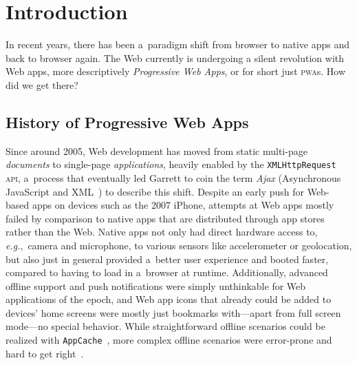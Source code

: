 \documentclass[sigconf]{acmart}
\begin{document}
%
%


\maketitle

\section{Introduction}

In recent years, there has been a~paradigm shift
from browser to native apps and back to browser again.
The Web currently is undergoing a silent revolution with Web apps,
more descriptively \emph{Progressive Web Apps},
or for short just \textsc{pwa}s.
How did we get there?

\subsection{History of Progressive Web Apps}

Since around 2005, Web development has moved from static multi-page \emph{documents}
to single-page \emph{applications}, heavily enabled by the \texttt{XMLHttpRequest} \textsc{api},
a~process that eventually led Garrett to coin the term \emph{Ajax}
(Asynchronous JavaScript and XML~\cite{garret2005ajax}) to describe this shift.
Despite an early push for Web-based apps on devices such as the 2007 iPhone,
attempts at Web apps mostly failed by comparison to native apps
that are distributed through app stores rather than the Web.
Native apps not only had direct hardware access to, \emph{e.g.},\ camera and microphone,
to various sensors like accelerometer or geolocation, but also just in general provided
a~better user experience and booted faster, compared to having to load in a~browser at runtime.
Additionally, advanced offline support and push notifications were simply unthinkable
for Web applications of the epoch, and Web app icons
that already could be added to devices' home screens
were mostly just bookmarks with---apart from full screen mode---no special behavior.
While straightforward offline scenarios could be realized with
\texttt{AppCache}~\cite{vankesteren2008offlinewebapps}, more complex offline scenarios were error-prone
and hard to get right~\cite{archibald2012douchebag}.
\end{document}
